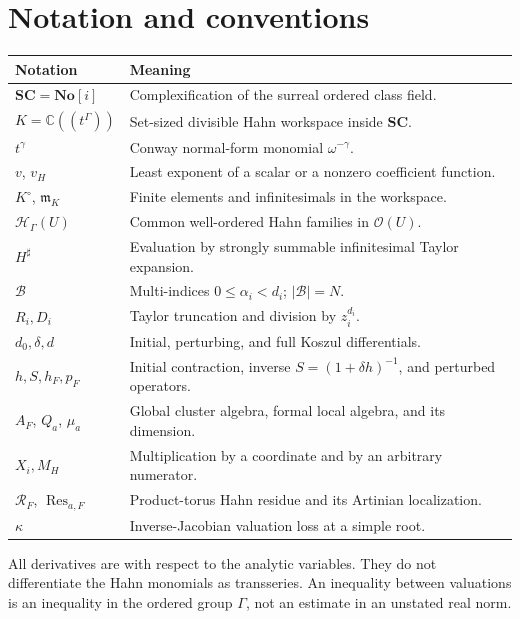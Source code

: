 \documentclass[11pt,letterpaper]{article}
\theoremstyle{definition}
\theoremstyle{remark}
\newcommand{\No}{\mathbf{No}}
\newcommand{\SC}{\mathbf{SC}}
\newcommand{\C}{\mathbb C}
\newcommand{\OO}{\mathcal O}
\newcommand{\HH}{\mathcal H}
\newcommand{\mm}{\mathfrak m}
\newcommand{\BB}{\mathcal B}
\newcommand{\RR}{\mathscr R}
\newcommand{\sh}{^{\sharp}}
\newcommand{\Res}{\operatorname{Res}}
\numberwithin{equation}{section}
\begin{document}
\section{Notation and conventions}
\begin{center}\small
\begin{tabular}{@{}L{0.25\textwidth}L{0.64\textwidth}@{}}
\toprule
Notation & Meaning\\
\midrule
$\SC=\No[i]$ & Complexification of the surreal ordered class field.\\[0.25em]
$K=\C((t^\Gamma))$ & Set-sized divisible Hahn workspace inside $\SC$.\\[0.25em]
$t^\gamma$ & Conway normal-form monomial $\omega^{-\gamma}$.\\[0.25em]
$v$, $v_H$ & Least exponent of a scalar or a nonzero coefficient function.\\[0.25em]
$K^\circ$, $\mm_K$ & Finite elements and infinitesimals in the workspace.\\[0.25em]
$\HH_\Gamma(U)$ & Common well-ordered Hahn families in $\OO(U)$.\\[0.25em]
$H\sh$ & Evaluation by strongly summable infinitesimal Taylor expansion.\\[0.25em]
$\BB$ & Multi-indices $0\le\alpha_i<d_i$; $|\BB|=N$.\\[0.25em]
$R_i,D_i$ & Taylor truncation and division by $z_i^{d_i}$.\\[0.25em]
$d_0,\delta,d$ & Initial, perturbing, and full Koszul differentials.\\[0.25em]
$h,S,h_F,p_F$ & Initial contraction, inverse $S=(1+\delta h)^{-1}$, and perturbed operators.\\[0.25em]
$A_F$, $Q_a$, $\mu_a$ & Global cluster algebra, formal local algebra, and its dimension.\\[0.25em]
$X_i,M_H$ & Multiplication by a coordinate and by an arbitrary numerator.\\[0.25em]
$\RR_F$, $\Res_{a,F}$ & Product-torus Hahn residue and its Artinian localization.\\[0.25em]
$\kappa$ & Inverse-Jacobian valuation loss at a simple root.\\
\bottomrule
\end{tabular}
\end{center}
All derivatives are with respect to the analytic variables. They do not differentiate the Hahn monomials as transseries. An inequality between valuations is an inequality in the ordered group $\Gamma$, not an estimate in an unstated real norm.
\end{document}
